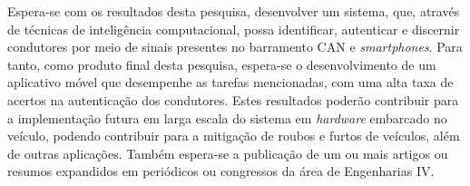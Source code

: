 Espera-se com os resultados desta pesquisa, desenvolver um sistema, que, através de técnicas de inteligência computacional, possa identificar, autenticar e discernir condutores por meio de sinais presentes no barramento CAN e \textit{smartphones}. Para tanto, como produto final desta pesquisa, espera-se o desenvolvimento de um aplicativo móvel que desempenhe as tarefas mencionadas, com uma alta taxa de acertos na autenticação dos condutores. Estes resultados poderão contribuir para a implementação futura em larga escala do sistema em \textit{hardware} embarcado no veículo, podendo contribuir para a mitigação de roubos e furtos de veículos, além de outras aplicações. Também espera-se a publicação de um ou mais artigos ou resumos expandidos em periódicos ou congressos da área de Engenharias IV.